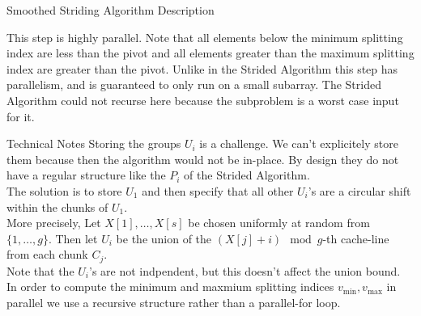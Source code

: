 \documentclass[xcolor=x11names, svgnames, rgb]{beamer}
\newcommand{\polylog}{\operatorname{polylog}}
\begin{document}
\begin{frame}[t]{Smoothed Striding Algorithm Description}
\begin{overprint}
	\end{overprint}
	\vspace{0.25cm}
	\begin{overprint}
	This step is highly parallel.
	\onslide<4>Note that all elements below the minimum splitting index are less than the pivot and all elements greater than the maximum splitting index are greater than the pivot.
	\onslide<5>Unlike in the Strided Algorithm this step has parallelism, and is guaranteed to only run on a small subarray. The Strided Algorithm could not recurse here because the subproblem is a worst case input for it.
	\end{overprint}
	
\end{frame}

\begin{frame}[t]{Technical Notes}
	Storing the groups $U_i$ is a challenge. We can't explicitely store them because then the algorithm would not be in-place. By design they do not have a regular structure like the $P_i$ of the Strided Algorithm.\\
	The solution is to store $U_1$ and then specify that all other $U_i$'s are a circular shift within the chunks of $U_1$.\\
	More precisely, Let $X[1],\ldots, X[s]$ be chosen uniformly at random from $\{1,\ldots, g\}$. 
	Then let $U_i$ be the union of the $(X[j]+i)\mod g$-th cache-line from each chunk $C_j$.\\
	Note that the $U_i$'s are not indpendent, but this doesn't affect the union bound.\\
	\vspace{0.5cm}
	In order to compute the minimum and maxmium splitting indices $v_{\min}, v_{\max}$ in parallel we use a recursive structure rather than a parallel-for loop.
\end{frame}


\end{document}
